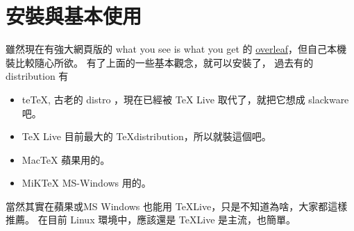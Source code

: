 \chapter{安裝與基本使用}
雖然現在有強大網頁版的 what you see is what you get 的 
\href{https://www.overleaf.com/}{overleaf}，但自己本機裝比較隨心所欲。
有了上面的一些基本觀念，就可以安裝了， 過去有的 distribution 有
\begin{itemize}
 \item teTeX, 古老的 distro ，現在已經被 TeX Live 取代了，就把它想成 slackware 吧。
 \item TeX Live 目前最大的 \TeX distribution，所以就裝這個吧。
 \item MacTeX 蘋果用的。
 \item MiKTeX MS-Windows 用的。
\end{itemize}
當然其實在蘋果或MS Windows 也能用 \TeX Live，只是不知道為啥，大家都這樣推薦。
在目前 Linux 環境中，應該還是 \TeX Live 是主流，也簡單。

